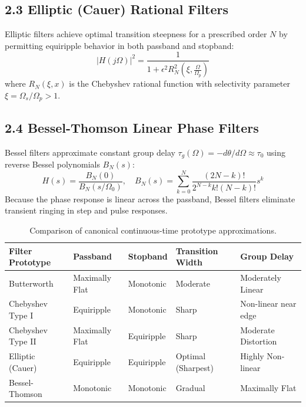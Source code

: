 \documentclass[11pt,a4paper]{article}
\begin{document}
\subsection*{2.3 Elliptic (Cauer) Rational Filters}
Elliptic filters achieve optimal transition steepness for a prescribed order $N$ by permitting equiripple behavior in both passband and stopband:
\begin{equation}
|H(j\Omega)|^2 = \frac{1}{1 + \epsilon^2 R_N^2\left(\xi, \frac{\Omega}{\Omega_p}\right)}
\end{equation}
where $R_N(\xi, x)$ is the Chebyshev rational function with selectivity parameter $\xi = \Omega_s / \Omega_p > 1$.

\subsection*{2.4 Bessel-Thomson Linear Phase Filters}
Bessel filters approximate constant group delay $\tau_g(\Omega) = -d\theta/d\Omega \approx \tau_0$ using reverse Bessel polynomials $B_N(s)$:
\begin{equation}
H(s) = \frac{B_N(0)}{B_N(s/\Omega_0)}, \quad B_N(s) = \sum_{k=0}^{N} \frac{(2N - k)!}{2^{N-k} k! (N-k)!} s^k
\end{equation}
Because the phase response is linear across the passband, Bessel filters eliminate transient ringing in step and pulse responses.

\vspace{6pt}
\begin{table}[h!]
\centering
\small
\renewcommand{\arraystretch}{1.15}
\begin{tabular}{lllll}
\toprule
\textbf{Filter Prototype} & \textbf{Passband} & \textbf{Stopband} & \textbf{Transition Width} & \textbf{Group Delay} \\
\midrule
Butterworth & Maximally Flat & Monotonic & Moderate & Moderately Linear \\
Chebyshev Type I & Equiripple & Monotonic & Sharp & Non-linear near edge \\
Chebyshev Type II & Maximally Flat & Equiripple & Sharp & Moderate Distortion \\
Elliptic (Cauer) & Equiripple & Equiripple & Optimal (Sharpest) & Highly Non-linear \\
Bessel-Thomson & Monotonic & Monotonic & Gradual & Maximally Flat \\
\bottomrule
\end{tabular}
\caption{Comparison of canonical continuous-time prototype approximations.}
\end{table}
\end{document}
